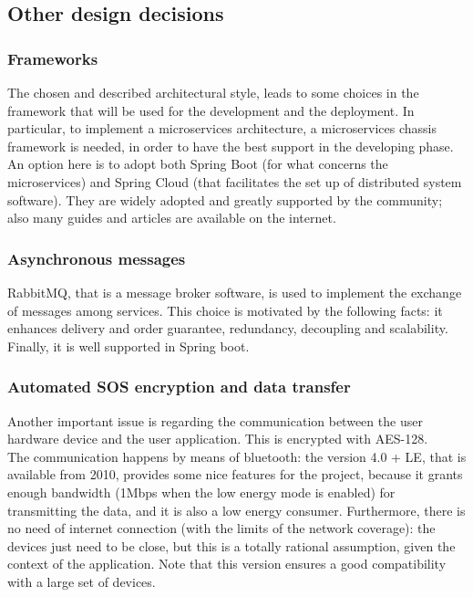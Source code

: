 \subsection{Other design decisions}
\subsubsection{Frameworks}
The chosen and described architectural style, leads to some choices in the framework that will be used for the development and the deployment. 
In particular, to implement a microservices architecture, a microservices chassis framework is needed, in order to have the best support 
in the developing phase. 
An option here is to adopt both Spring Boot (for what concerns the microservices) and Spring Cloud (that facilitates the set up of distributed
system software). They are widely adopted and greatly supported by the community; also many guides and articles are available on the internet. \\

\subsubsection{Asynchronous messages}
RabbitMQ, that is a message broker software, is used to implement the exchange of messages among services. This choice is motivated 
by the following facts: it enhances delivery and order guarantee, redundancy, decoupling and scalability. 
Finally, it is well supported in Spring boot. 

\subsubsection{Automated SOS encryption and data transfer}
Another important issue is regarding the communication between the user hardware device and the user application. This is encrypted with
AES-128. \\
The communication happens by means of bluetooth: the version 4.0 + LE, that is available from 2010, provides some nice features for the
project, because it grants enough bandwidth (1Mbps when the low energy mode is enabled) for transmitting the data, and it is also a low
energy consumer. Furthermore, there is no need of internet connection (with the limits of the network coverage): the devices just need to be
close, but this is a totally rational assumption, given the context of the application. 
Note that this version ensures a good compatibility with a large set of devices. 

